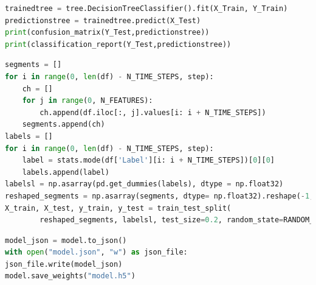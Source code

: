 \begin{appendices}
\begin{lstlisting}[language=Python, caption=Decision Tree Code]
trainedtree = tree.DecisionTreeClassifier().fit(X_Train, Y_Train)
predictionstree = trainedtree.predict(X_Test)
print(confusion_matrix(Y_Test,predictionstree))
print(classification_report(Y_Test,predictionstree))
\end{lstlisting}

\clearpage

\begin{lstlisting}[language=Python, caption=LSTM Preprocessing]
segments = []
for i in range(0, len(df) - N_TIME_STEPS, step):
    ch = []
    for j in range(0, N_FEATURES):
        ch.append(df.iloc[:, j].values[i: i + N_TIME_STEPS])
    segments.append(ch)
labels = []
for i in range(0, len(df) - N_TIME_STEPS, step):
    label = stats.mode(df['Label'][i: i + N_TIME_STEPS])[0][0]
    labels.append(label)
labelsl = np.asarray(pd.get_dummies(labels), dtype = np.float32)
reshaped_segments = np.asarray(segments, dtype= np.float32).reshape(-1, N_TIME_STEPS, N_FEATURES)
X_train, X_test, y_train, y_test = train_test_split(
        reshaped_segments, labelsl, test_size=0.2, random_state=RANDOM_SEED)
\end{lstlisting}

\begin{lstlisting}[language=Python, caption=Storing CNN Model]
model_json = model.to_json()
with open("model.json", "w") as json_file:
json_file.write(model_json)
model.save_weights("model.h5")
\end{lstlisting}


% 






\end{appendices}
